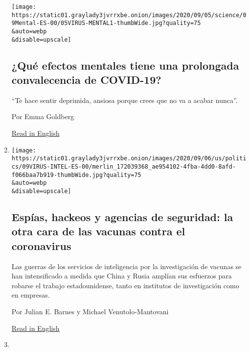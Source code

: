 \begin{enumerate}
  \texttt{[image: https://static01.graylady3jvrrxbe.onion/images/2020/09/05/science/09Mental-ES-00/05VIRUS-MENTAL1-thumbWide.jpg?quality=75\\\&auto=webp\\\&disable=upscale]}

  \hypertarget{quuxe9-efectos-mentales-tiene-una-prolongada-convalecencia-de-covid-19}{%
  \subsection{¿Qué efectos mentales tiene una prolongada convalecencia
  de
  COVID-19?}\label{quuxe9-efectos-mentales-tiene-una-prolongada-convalecencia-de-covid-19}}

  ``Te hace sentir deprimida, ansiosa porque crees que no va a acabar
  nunca''.

  Por Emma Goldberg

  \href{https://www.nytimes3xbfgragh.onion/2020/09/07/health/coronavirus-mental-health-long-hauler.html}{Read
  in English}
\item
  \href{/es/2020/09/09/espanol/estados-unidos/vacuna-coronavirus-espionaje.html}{}

  \texttt{[image: https://static01.graylady3jvrrxbe.onion/images/2020/09/06/us/politics/09VIRUS-INTEL-ES-00/merlin\_172039368\_ae954102-4fba-4dd0-8afd-f066baa7b919-thumbWide.jpg?quality=75\\\&auto=webp\\\&disable=upscale]}

  \hypertarget{espuxedas-hackeos-y-agencias-de-seguridad-la-otra-cara-de-las-vacunas-contra-el-coronavirus}{%
  \subsection{Espías, hackeos y agencias de seguridad: la otra cara de
  las vacunas contra el
  coronavirus}\label{espuxedas-hackeos-y-agencias-de-seguridad-la-otra-cara-de-las-vacunas-contra-el-coronavirus}}

  Las guerras de los servicios de inteligencia por la investigación de
  vacunas se han intensificado a medida que China y Rusia amplían sus
  esfuerzos para robarse el trabajo estadounidense, tanto en institutos
  de investigación como en empresas.

  Por Julian E. Barnes y Michael Venutolo-Mantovani

  \href{https://www.nytimes3xbfgragh.onion/2020/09/05/us/politics/coronavirus-vaccine-espionage.html}{Read
  in English}
\item
  \href{/es/2020/09/09/espanol/ciencia-y-tecnologia/vacuna-cruda-mascarilla-coronavirus.html}{}


\end{enumerate}
